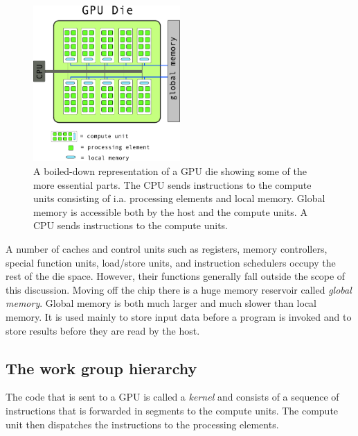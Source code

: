 \documentclass[11pt,twoside]{report}
\begin{document}
\begin{figure}[htbp]
	\begin{center}
	\vspace{-10pt}
  \includegraphics[width=0.5\textwidth]{img/GPU_arch.pdf}
	\end{center}
  \caption{A boiled-down representation of a GPU die showing some of the more essential parts. The CPU sends  instructions to the compute units consisting of i.a. processing elements and local memory. Global memory is accessible both by the host and the compute units. A CPU sends instructions to the compute units.}
	\label{fig:hw_layout}
	\vspace{-5pt}
\end{figure}


\indent A number of caches and control units such as registers, memory controllers, special function units, load/store units, and instruction schedulers occupy the rest of the die space. However, their functions generally fall outside the scope of this discussion. Moving off the chip there is a huge memory reservoir called {\it global memory}. Global memory is both much larger and much slower than local memory. It is used mainly to store input data before a program is invoked and to store results before they are read by the host. 

\subsection{The work group hierarchy}
\label{sec:wg}
The code that is sent to a GPU is called a {\it kernel} and consists of a sequence of instructions that is forwarded in segments to the compute units. The compute unit then dispatches the instructions to the processing elements.
\end{document}
